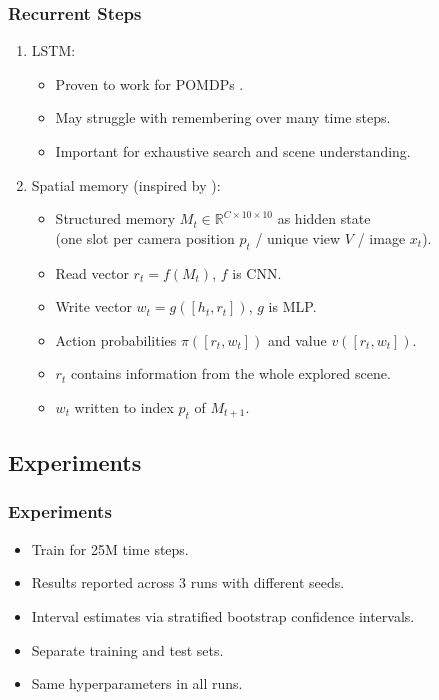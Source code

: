 \begin{frame}
    \frametitle{Recurrent Steps}

    \begin{enumerate}
        \item LSTM:
        \begin{itemize}
            \item Proven to work for POMDPs \cite{hausknecht_deep_2017,mnih_asynchronous_2016,mirowski_learning_2017,gupta_cognitive_2019}.
            \item May struggle with remembering over many time steps.
            \item Important for exhaustive search and scene understanding.
        \end{itemize}
        \item Spatial memory (inspired by \cite{parisotto_neural_2017}):
        \begin{itemize}
            \item Structured memory \(M_t \in \mathbb{R}^{C \times 10 \times 10}\) as hidden state \\
            (one slot per camera position \(p_t\) / unique view \(V\) / image \(x_t\)).
            \item Read vector \(r_t = f(M_t)\), \(f\) is CNN.
            \item Write vector \(w_t = g(\left\lbrack h_t, r_t \right\rbrack)\), \(g\) is MLP.
            \item Action probabilities \(\pi(\left\lbrack r_t, w_t \right\rbrack)\) and value \(v(\left\lbrack r_t, w_t \right\rbrack)\).
            \item \(r_t\) contains information from the whole explored scene.
            \item \(w_t\) written to index \(p_t\) of \(M_{t+1}\).
        \end{itemize}
    \end{enumerate}
\end{frame}

\subsection{Experiments}

\begin{frame}
    \frametitle{Experiments}

    \begin{itemize}
        \item Train for 25M time steps.
        \item Results reported across 3 runs with different seeds.
        \item Interval estimates via stratified bootstrap confidence intervals.
        \item Separate training and test sets.
        \item Same hyperparameters in all runs.
    \end{itemize}
\end{frame}

